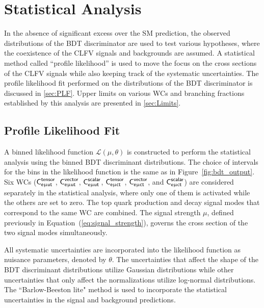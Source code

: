 \chapter{Statistical Analysis}
\label{chap:Results}

In the absence of significant excess over the \ac{SM} prediction, the observed distributions of the \ac{BDT} discriminator are used to test various hypotheses, where the coexistence of the \ac{CLFV} signals and backgrounds are assumed. A statistical method called ``profile likelihood'' is used to move the focus on the cross sections of the \ac{CLFV} signals while also keeping track of the systematic uncertainties. The profile likelihood fit performed on the distributions of the \ac{BDT} discriminator is discussed in \autoref{sec:PLF}. Upper limits on various \acp{WC} and branching fractions established by this analysis are presented in \autoref{sec:Limits}. 

\section{Profile Likelihood Fit}
\label{sec:PLF}

A binned likelihood function $\mathcal{L}(\mu, \theta)$ is constructed to perform the statistical analysis using the binned \ac{BDT} discriminant distributions. The choice of intervals for the bins in the likelihood function is the same as in Figure~\ref{fig:bdt_output}. Six \acp{WC} ($\textsf{C}^{\textsf{tensor}}_{\textsf{e}\upmu\textsf{{u}t}}$, $\textsf{C}^{\textsf{vector}}_{\textsf{e}\upmu\textsf{{u}t}}$, $\textsf{C}^{\textsf{scalar}}_{\textsf{e}\upmu\textsf{{u}t}}$, $\textsf{C}^{\textsf{tensor}}_{\textsf{e}\upmu\textsf{{c}t}}$, $\textsf{C}^{\textsf{vector}}_{\textsf{e}\upmu\textsf{{c}t}}$, and $\textsf{C}^{\textsf{scalar}}_{\textsf{e}\upmu\textsf{{c}t}}$) are considered separately in the statistical analysis, where only one of them is activated while the others are set to zero. The top quark production and decay signal modes that correspond to the same \ac{WC} are combined. The signal strength $\mu$, defined previously in Equation~(\ref{eq:signal_strength}), governs the cross section of the two signal modes simultaneously. 

All systematic uncertainties are incorporated into the likelihood function as nuisance parameters, denoted by $\theta$. The uncertainties that affect the shape of the \ac{BDT} discriminant distributions utilize Gaussian distributions while other uncertainties that only affect the normalizations utilize log-normal distributions. The ``Barlow-Beeston lite" method \cite{Barlow:1993dm} is used to incorporate the statistical uncertainties in the signal and background predictions. 

